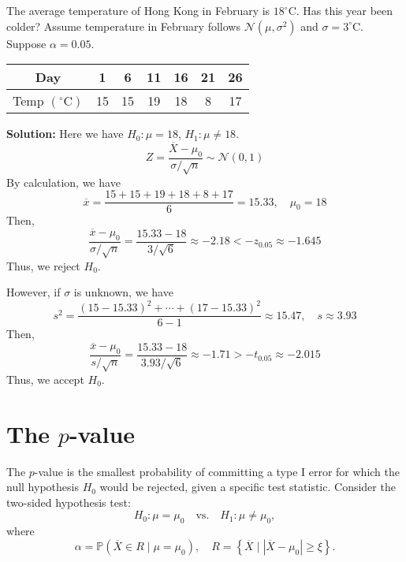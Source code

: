 \begin{eg}
  The average temperature of Hong Kong in February is \(18^\circ\text{C}\). Has this year been colder? Assume temperature in February follows \(\mathcal{N}(\mu, \sigma^2)\) and \(\sigma = 3^\circ\text{C}\). Suppose \(\alpha = 0.05\). 
  \begin{table}[H]
    \centering
    \begin{tabular}{c|c|c|c|c|c|c}
      \toprule
      Day & 1 & 6 & 11 & 16 & 21 & 26 \\
      \midrule
      Temp \((^\circ\text{C})\) & 15 & 15 & 19 & 18 & 8 & 17 \\
      \bottomrule
    \end{tabular}
  \end{table}

  \textbf{Solution:}  
  Here we have \(H_0: \mu = 18\), \(H_1: \mu \neq 18\).  
  \[
    Z = \dfrac{\overline{X} - \mu_0}{\sigma / \sqrt{n}} \sim \mathcal{N}(0, 1)
  \]
  By calculation, we have
  \[
    \overline{x} = \dfrac{15 + 15 + 19 + 18 + 8 + 17}{6} = 15.33, \quad \mu_0 = 18
  \]
  Then,
  \[
    \dfrac{\overline{x} - \mu_0}{\sigma / \sqrt{n}} = \dfrac{15.33 - 18}{3 / \sqrt{6}}  \approx -2.18 < -z_{0.05} \approx -1.645
  \]
  Thus, we reject \(H_0\).

  However, if \(\sigma\) is unknown, we have
  \[
    s^2 = \dfrac{(15 - 15.33)^2 + \cdots + (17 - 15.33)^2}{6 - 1} \approx 15.47, \quad s \approx 3.93
  \]
  Then,
  \[
    \dfrac{\overline{x} - \mu_0}{s / \sqrt{n}} = \dfrac{15.33 - 18}{3.93 / \sqrt{6}} \approx -1.71 > -t_{0.05} \approx -2.015
  \]
  Thus, we accept \(H_0\).
\end{eg}

\section{The \(p\)-value}
The \(p\)-value is the smallest probability of committing a type I error for which the null hypothesis \(H_0\) would be rejected, given a specific test statistic. Consider the two-sided hypothesis test:
\[
  H_0: \mu = \mu_0 \quad \text{vs.} \quad H_1: \mu \neq \mu_0,
\]
where
\[
  \alpha = \mathbb{P}(\overline{X} \in R \mid \mu = \mu_0), \quad R = \left\{ \overline{X} \; \bigg| \; \left| \overline{X} - \mu_0 \right| \geq \xi \right\}.
\]

